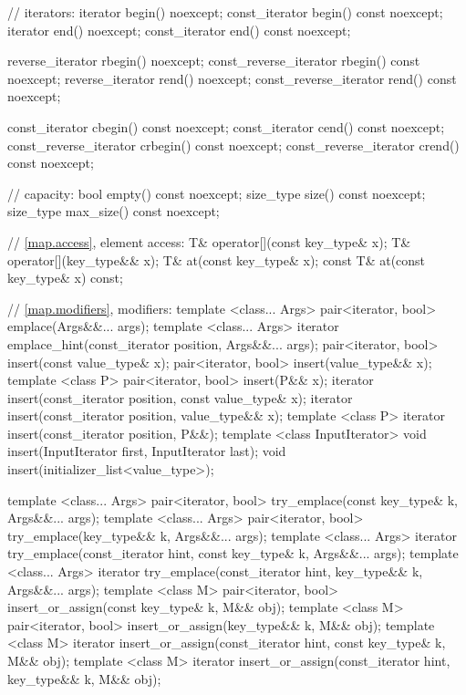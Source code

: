 \begin{codeblock}
{{    // iterators:
    iterator               begin() noexcept;
    const_iterator         begin() const noexcept;
    iterator               end() noexcept;
    const_iterator         end() const noexcept;

    reverse_iterator       rbegin() noexcept;
    const_reverse_iterator rbegin() const noexcept;
    reverse_iterator       rend() noexcept;
    const_reverse_iterator rend() const noexcept;

    const_iterator         cbegin() const noexcept;
    const_iterator         cend() const noexcept;
    const_reverse_iterator crbegin() const noexcept;
    const_reverse_iterator crend() const noexcept;

    // capacity:
    bool      empty() const noexcept;
    size_type size() const noexcept;
    size_type max_size() const noexcept;

    // \ref{map.access}, element access:
    T& operator[](const key_type& x);
    T& operator[](key_type&& x);
    T&       at(const key_type& x);
    const T& at(const key_type& x) const;

    // \ref{map.modifiers}, modifiers:
    template <class... Args> pair<iterator, bool> emplace(Args&&... args);
    template <class... Args> iterator emplace_hint(const_iterator position, Args&&... args);
    pair<iterator, bool> insert(const value_type& x);
    pair<iterator, bool> insert(value_type&& x);
    template <class P> pair<iterator, bool> insert(P&& x);
    iterator insert(const_iterator position, const value_type& x);
    iterator insert(const_iterator position, value_type&& x);
    template <class P>
      iterator insert(const_iterator position, P&&);
    template <class InputIterator>
      void insert(InputIterator first, InputIterator last);
    void insert(initializer_list<value_type>);

    template <class... Args>
      pair<iterator, bool> try_emplace(const key_type& k, Args&&... args);
    template <class... Args>
      pair<iterator, bool> try_emplace(key_type&& k, Args&&... args);
    template <class... Args>
      iterator try_emplace(const_iterator hint, const key_type& k, Args&&... args);
    template <class... Args>
      iterator try_emplace(const_iterator hint, key_type&& k, Args&&... args);
    template <class M>
      pair<iterator, bool> insert_or_assign(const key_type& k, M&& obj);
    template <class M>
      pair<iterator, bool> insert_or_assign(key_type&& k, M&& obj);
    template <class M>
      iterator insert_or_assign(const_iterator hint, const key_type& k, M&& obj);
    template <class M>
      iterator insert_or_assign(const_iterator hint, key_type&& k, M&& obj);

}}
\end{codeblock}
